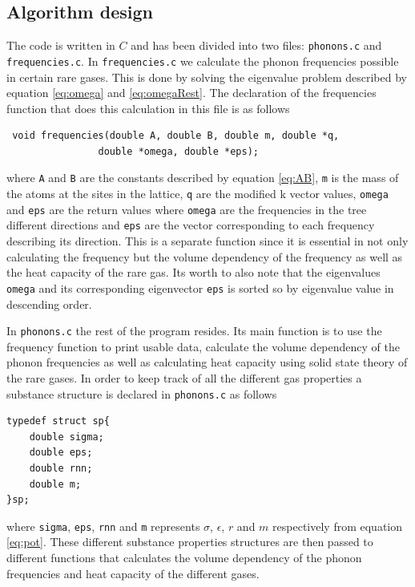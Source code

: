 \documentclass[11pt]{article}
\begin{document}
\subsection{Algorithm design}
The code is written in $C$ and has been divided into two files: \verb+phonons.c+ and \verb+frequencies.c+. In \verb+frequencies.c+ we calculate the phonon frequencies possible in certain rare gases. This is done by solving the eigenvalue problem described by equation \ref{eq:omega} and \ref{eq:omegaRest}. The declaration of the frequencies function that does this calculation in this file is as follows
\begin{lstlisting}
 void frequencies(double A, double B, double m, double *q, 
				double *omega, double *eps);
\end{lstlisting}
where \verb+A+ and \verb+B+ are the constants described by equation \ref{eq:AB}, \verb+m+ is the mass of the atoms at the sites in the lattice, \verb+q+ are the modified k vector values, \verb+omega+ and \verb+eps+ are the return values where \verb+omega+ are the frequencies in the tree different directions and \verb+eps+ are the vector corresponding to each frequency describing its direction. This is a separate function since it is essential in not only calculating the frequency but the volume dependency of the frequency as well as the heat capacity of the rare gas. Its worth to also note that the eigenvalues \verb+omega+ and its corresponding eigenvector \verb+eps+ is sorted so by eigenvalue value in descending order.

In \verb+phonons.c+ the rest of the program resides. Its main function is to use the frequency function to print usable data, calculate the volume dependency of the phonon frequencies as well as calculating heat capacity using solid state theory of the rare gases. In order to keep track of all the different gas properties a substance structure is declared in \verb+phonons.c+ as follows
\begin{lstlisting}
typedef struct sp{
	double sigma;
	double eps;
	double rnn;
	double m;
}sp;
\end{lstlisting}
where \verb+sigma+, \verb+eps+, \verb+rnn+ and \verb+m+ represents $\sigma$, $\epsilon$, $r$ and $m$ respectively from equation \ref{eq:pot}. These different substance properties structures are then passed to different functions that calculates the volume dependency of the phonon frequencies and heat capacity of the different gases.
\end{document}
